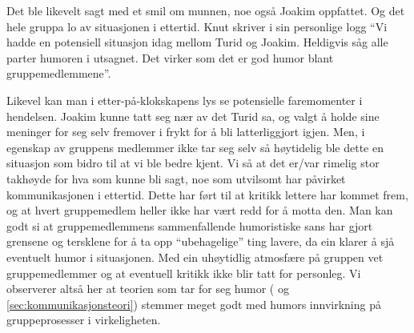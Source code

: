  Det ble likevelt sagt med et smil om munnen, noe også Joakim oppfattet. 
Og det hele gruppa lo av situasjonen i ettertid. Knut skriver i sin personlige
logg ``Vi hadde en potensiell situasjon idag mellom Turid og Joakim. Heldigvis
såg alle parter humoren i utsagnet. Det virker som det er god humor blant gruppemedlemmene''.

Likevel kan man i etter-på-klokskapens lys se potensielle faremomenter
i hendelsen. Joakim kunne tatt seg nær av det Turid sa, og valgt å holde sine
meninger for seg selv fremover i frykt for å bli latterliggjort igjen. Men, i
egenskap av gruppens medlemmer ikke tar seg selv så høytidelig ble dette en
situasjon som bidro til at vi ble bedre kjent. Vi så at det er/var
rimelig stor takhøyde for hva som kunne bli sagt, noe som utvilsomt har påvirket
kommunikasjonen i ettertid. Dette har ført til at kritikk lettere
har kommet frem, og at hvert gruppemedlem heller ikke har vært redd for å motta
den. Man kan godt si at gruppemedlemmens sammenfallende humoristiske sans har
gjort grensene og tersklene for å ta opp ``ubehagelige'' ting lavere, da ein klarer å 
sjå eventuelt humor i situasjonen. Med ein uhøytidlig atmosfære på gruppen vet gruppemedlemmer
og at eventuell kritikk ikke blir tatt for personleg. Vi observerer altså her at teorien 
som tar for seg humor (\cite{jj-humor} og \cref{sec:kommunikasjonsteori}) stemmer 
meget godt med humors innvirkning på gruppeprosesser i virkeligheten.
